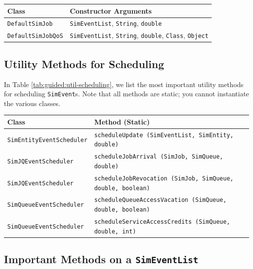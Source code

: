 \documentclass[12pt]{book}
\begin{document}
\begin{table}[h]
\label{tab:guided:simjob-implementations}
\caption{Important \texttt{SimJob} Implementations.}
\begin{longtabu}{|l|l|}
\hline
Class & Constructor Arguments \\ \hline
\lstinline|DefaultSimJob|     & \lstinline|SimEventList|, \lstinline|String|, \lstinline|double|
  \\ \hline
\lstinline|DefaultSimJobQoS|  & \lstinline|SimEventList|, \lstinline|String|, \lstinline|double|, \lstinline|Class|, \lstinline|Object|
  \\ \hline
\end{longtabu}
\end{table}

\subsection{Utility Methods for Scheduling}

In Table \ref{tab:guided:util-scheduling},
  we list the most important utility methods for scheduling
  \lstinline|SimEvent|s.
Note that all methods are static; you cannot instantiate the
  various classes.

\begin{table}[h]
\label{tab:guided:util-scheduling}
\caption{Utility Methods for Scheduling.}
\begin{longtabu}{|l|l|}
\hline
Class & Method (Static) \\ \hline
\lstinline|SimEntityEventScheduler| & \lstinline|scheduleUpdate (SimEventList, SimEntity, double)|
  \\ \hline
\lstinline|SimJQEventScheduler|     & \lstinline|scheduleJobArrival (SimJob, SimQueue, double)|
  \\ \hline
\lstinline|SimJQEventScheduler|     & \lstinline|scheduleJobRevocation (SimJob, SimQueue, double, boolean)|
  \\ \hline
\lstinline|SimQueueEventScheduler|  & \lstinline|scheduleQueueAccessVacation (SimQueue, double, boolean)|
  \\ \hline
\lstinline|SimQueueEventScheduler|  & \lstinline|scheduleServiceAccessCredits (SimQueue, double, int)|
  \\ \hline
\end{longtabu}
\end{table}

\subsection{Important Methods on a \texttt{SimEventList}}
\end{document}
